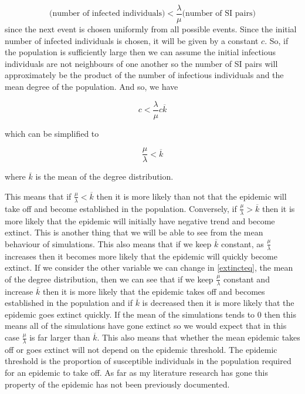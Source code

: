 \documentclass{uonmathsreport}
\begin{document}
\begin{equation}
\mbox{(number of infected individuals)}<\frac{\lambda}{\mu}\mbox{(number of SI pairs)}
\end{equation}
\noindent
since the next event is chosen uniformly from all possible events. Since the initial number of infected individuals is chosen, it will be given by a constant $c$. So, if the population is sufficiently large then we can assume the initial infectious individuals are not neighbours of one another so the number of SI pairs will approximately be the product of the number of infectious individuals and the mean degree of the population. And so, we have

\begin{equation}
c<\frac{\lambda}{\mu}c\overline{k}
\end{equation}

\noindent
which can be simplified to 

\begin{equation}
\frac{\mu}{\lambda}<\overline{k}
\label{extincteq}
\end{equation}

\noindent
where $\overline{k}$ is the mean of the degree distribution.

This means that if $\frac{\mu}{\lambda}<\overline{k}$ then it is more likely than not that the epidemic will take off and become established in the population. Conversely, if $\frac{\mu}{\lambda}>\overline{k}$ then it is more likely that the epidemic will initially have negative trend and become extinct. This is another thing that we will be able to see from the mean behaviour of simulations. This also means that if we keep $\overline{k}$ constant, as $\frac{\mu}{\lambda}$ increases then it becomes more likely that the epidemic will quickly become extinct. If we consider the other variable we can change in \eqref{extincteq}, the mean of the degree distribution, then we can see that if we keep $\frac{\mu}{\lambda}$ constant and increase $\overline{k}$ then it is more likely that the epidemic takes off and becomes established in the population and if $\overline{k}$ is decreased then it is more likely that the epidemic goes extinct quickly. If the mean of the simulations tends to $0$ then this means all of the simulations have gone extinct so we would expect that in this case $\frac{\mu}{\lambda}$ is far larger than $\overline{k}$. This also means that whether the mean epidemic takes off or goes extinct will not depend on the epidemic threshold. The epidemic threshold is the proportion of susceptible individuals in the population required for an epidemic to take off. As far as my literature research has gone this property of the epidemic has not been previously documented.
\end{document}

